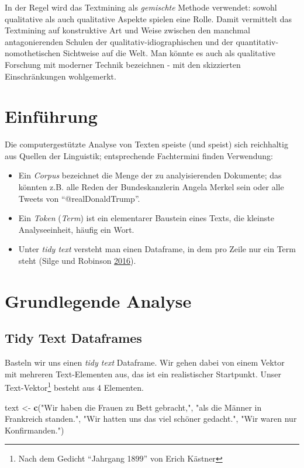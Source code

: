 \documentclass[12pt,ngerman,]{book}
\makeatletter
\newenvironment{Shaded}{\begin{snugshade}}{\end{snugshade}}
\newcommand{\KeywordTok}[1]{\textcolor[rgb]{0.13,0.29,0.53}{\textbf{{#1}}}}
\newcommand{\StringTok}[1]{\textcolor[rgb]{0.31,0.60,0.02}{{#1}}}
\newcommand{\NormalTok}[1]{{#1}}
\let\rmarkdownfootnote\footnote%
\def\footnote{\protect\rmarkdownfootnote}
\newenvironment{kframe}{%
\medskip{}
\setlength{\fboxsep}{.8em}
 \def\at@end@of@kframe{}%
 \ifinner\ifhmode%
  \def\at@end@of@kframe{\end{minipage}}%
  \begin{minipage}{\columnwidth}%
 \fi\fi%
 \def\FrameCommand##1{\hskip\@totalleftmargin \hskip-\fboxsep
 \colorbox{shadecolor}{##1}\hskip-\fboxsep
     \hskip-\linewidth \hskip-\@totalleftmargin \hskip\columnwidth}%
 \MakeFramed {\advance\hsize-\width
   \@totalleftmargin\z@ \linewidth\hsize
   \@setminipage}}%
 {\par\unskip\endMakeFramed%
 \at@end@of@kframe}
\renewenvironment{Shaded}{\begin{kframe}}{\end{kframe}}
\makeatother
\begin{document}
In der Regel wird das Textmining als \emph{gemischte} Methode verwendet:
sowohl qualitative als auch qualitative Aspekte spielen eine Rolle.
Damit vermittelt das Textmining auf konstruktive Art und Weise zwischen
den manchmal antagonierenden Schulen der qualitativ-idiographischen und
der quantitativ-nomothetischen Sichtweise auf die Welt. Man könnte es
auch als qualitative Forschung mit moderner Technik bezeichnen - mit den
skizzierten Einschränkungen wohlgemerkt.

\section{Einführung}\label{einfuhrung-1}

Die computergestützte Analyse von Texten speiste (und speist) sich
reichhaltig aus Quellen der Linguistik; entsprechende Fachtermini finden
Verwendung:

\begin{itemize}
\item
  Ein \emph{Corpus} bezeichnet die Menge der zu analyisierenden
  Dokumente; das könnten z.B. alle Reden der Bundeskanzlerin Angela
  Merkel sein oder alle Tweets von ``@realDonaldTrump''.
\item
  Ein \emph{Token} (\emph{Term}) ist ein elementarer Baustein eines
  Texts, die kleinste Analyseeinheit, häufig ein Wort.
\item
  Unter \emph{tidy text} versteht man einen Dataframe, in dem pro Zeile
  nur ein Term steht (Silge und Robinson
  \protect\hyperlink{ref-Silge2016}{2016}).
\end{itemize}

\section{Grundlegende Analyse}\label{grundlegende-analyse}

\subsection{Tidy Text Dataframes}\label{tidy-text-dataframes}

Basteln wir uns einen \emph{tidy text} Dataframe. Wir gehen dabei von
einem Vektor mit mehreren Text-Elementen aus, das ist ein realistischer
Startpunkt. Unser Text-Vektor\footnote{Nach dem Gedicht ``Jahrgang
  1899'' von Erich Kästner} besteht aus 4 Elementen.

\begin{Shaded}
\begin{Highlighting}[]
\NormalTok{text <-}\StringTok{ }\KeywordTok{c}\NormalTok{(}\StringTok{"Wir haben die Frauen zu Bett gebracht,"}\NormalTok{,}
          \StringTok{"als die Männer in Frankreich standen."}\NormalTok{,}
          \StringTok{"Wir hatten uns das viel schöner gedacht."}\NormalTok{,}
          \StringTok{"Wir waren nur Konfirmanden."}\NormalTok{)}
\end{Highlighting}
\end{Shaded}
\end{document}
